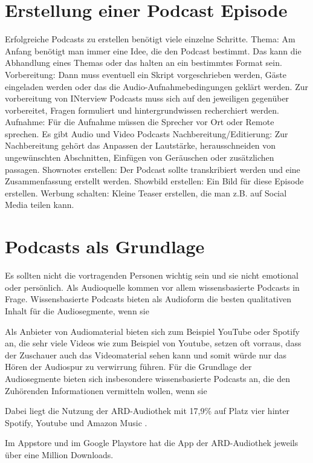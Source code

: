\section{Erstellung einer Podcast Episode}

Erfolgreiche Podcasts zu erstellen benötigt viele einzelne Schritte.
Thema:
Am Anfang benötigt man immer eine Idee, die den Podcast bestimmt.
Das kann die Abhandlung eines Themas oder das halten an ein bestimmtes Format sein.
Vorbereitung:
Dann muss eventuell ein Skript vorgeschrieben werden, Gäste eingeladen werden oder das die Audio-Aufnahmebedingungen geklärt werden.
Zur vorbereitung von INterview Podcasts muss sich auf den jeweiligen gegenüber vorbereitet, Fragen formuliert und hintergrundwissen recherchiert werden.
Aufnahme:
Für die Aufnahme müssen die Sprecher vor Ort oder Remote sprechen.
Es gibt Audio und Video Podcasts
Nachbereitung/Editierung:
Zur Nachbereitung gehört das Anpassen der Lautstärke, herausschneiden von ungewünschten Abschnitten, Einfügen von Geräuschen oder zusätzlichen passagen.
Shownotes erstellen:
Der Podcast sollte transkribiert werden und eine Zusammenfassung erstellt werden.
Showbild erstellen:
Ein Bild für diese Episode erstellen.
Werbung schalten:
Kleine Teaser erstellen, die man z.B. auf Social Media teilen kann.

\section{Podcasts als Grundlage}

Es sollten nicht die vortragenden Personen wichtig sein und sie nicht emotional oder persönlich. 
Als Audioquelle kommen vor allem wissensbasierte Podcasts in Frage. 
Wissensbasierte Podcasts bieten als Audioform die besten qualitativen Inhalt für die Audiosegmente, wenn sie 

Als Anbieter von Audiomaterial bieten sich zum Beispiel YouTube oder Spotify an, die sehr viele 
Videos wie zum Beispiel von Youtube, setzen oft vorraus, dass der Zuschauer auch das Videomaterial sehen kann und somit würde nur das Hören der Audiospur zu verwirrung führen.
Für die Grundlage der Audiosegmente bieten sich insbesondere wissensbasierte Podcasts an, die den Zuhörenden Informationen vermitteln wollen, wenn sie 

Dabei liegt die Nutzung der ARD-Audiothek mit 17,9\% auf Platz vier hinter Spotify, Youtube und Amazon Music \cite{mindline-media2023}.

Im Appstore und im Google Playstore hat die App der ARD-Audiothek jeweils über eine Million Downloads.
\cite{gotting2023}

